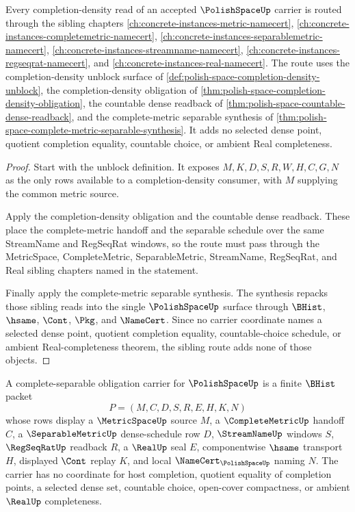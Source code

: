 \begin{theorem}
\label{thm:polish-space-l10-sibling-route}
Every completion-density read of an accepted $\PolishSpaceUp$ carrier is routed through the sibling chapters \autoref{ch:concrete-instances-metric-namecert}, \autoref{ch:concrete-instances-completemetric-namecert}, \autoref{ch:concrete-instances-separablemetric-namecert}, \autoref{ch:concrete-instances-streamname-namecert}, \autoref{ch:concrete-instances-regseqrat-namecert}, and \autoref{ch:concrete-instances-real-namecert}. The route uses the completion-density unblock surface of \autoref{def:polish-space-completion-density-unblock}, the completion-density obligation of \autoref{thm:polish-space-completion-density-obligation}, the countable dense readback of \autoref{thm:polish-space-countable-dense-readback}, and the complete-metric separable synthesis of \autoref{thm:polish-space-complete-metric-separable-synthesis}. It adds no selected dense point, quotient completion equality, countable choice, or ambient Real completeness.
\end{theorem}
\begin{proof}
Start with the unblock definition. It exposes $M,K,D,S,R,W,H,C,G,N$ as the only rows available to a completion-density consumer, with $M$ supplying the common metric source.

Apply the completion-density obligation and the countable dense readback. These place the complete-metric handoff and the separable schedule over the same StreamName and RegSeqRat windows, so the route must pass through the MetricSpace, CompleteMetric, SeparableMetric, StreamName, RegSeqRat, and Real sibling chapters named in the statement.

Finally apply the complete-metric separable synthesis. The synthesis repacks those sibling reads into the single $\PolishSpaceUp$ surface through $\BHist$, $\hsame$, $\Cont$, $\Pkg$, and $\NameCert$. Since no carrier coordinate names a selected dense point, quotient completion equality, countable-choice schedule, or ambient Real-completeness theorem, the sibling route adds none of those objects.
\end{proof}

\begin{definition}
\label{def:polishspace-obligation-complete-separable-carrier}
A complete-separable obligation carrier for $\PolishSpaceUp$ is a finite $\BHist$ packet
$$
P=(M,C,D,S,R,E,H,K,N)
$$
whose rows display a $\MetricSpaceUp$ source $M$, a $\CompleteMetricUp$ handoff $C$, a $\SeparableMetricUp$ dense-schedule row $D$, $\StreamNameUp$ windows $S$, $\RegSeqRatUp$ readback $R$, a $\RealUp$ seal $E$, componentwise $\hsame$ transport $H$, displayed $\Cont$ replay $K$, and local $\NameCert_{\PolishSpaceUp}$ naming $N$. The carrier has no coordinate for host completion, quotient equality of completion points, a selected dense set, countable choice, open-cover compactness, or ambient $\RealUp$ completeness.
\end{definition}

